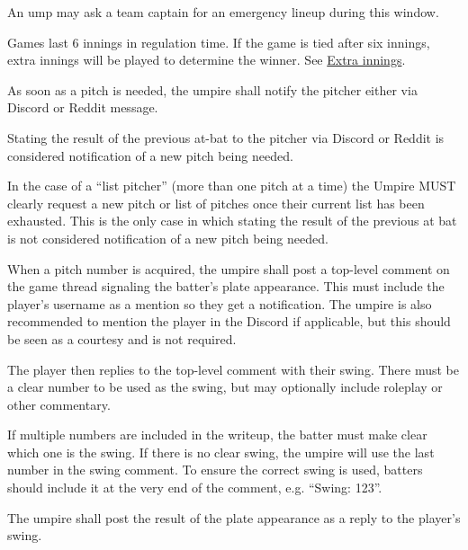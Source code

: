 \begin{deepEnumerate}
\begin{deepEnumerate}
\begin{deepEnumerate}
\begin{deepEnumerate}
\begin{deepEnumerate}
\begin{deepEnumerate}
						\item An ump may ask a team captain for an emergency lineup during this window.
					\end{deepEnumerate}
				\end{deepEnumerate}
			\end{deepEnumerate}
		\end{deepEnumerate}
		\item Games last 6 innings in regulation time. 
		If the game is tied after six innings, extra innings will be played to determine the winner. 
		See \hyperref[sec:extra innings]{Extra innings}.
		\item As soon as a pitch is needed, the umpire shall notify the pitcher either via Discord or Reddit message.
		\begin{deepEnumerate}
			\item Stating the result of the previous at-bat to the pitcher via Discord or Reddit is considered notification of a new 
			pitch being needed.
			\item  In the case of a “list pitcher” (more than one pitch at a time) the Umpire MUST clearly request a new pitch or list
			 of pitches once their current list has been exhausted. This is the only case in which stating the result of the previous
			 at bat is not considered notification of a new pitch being needed.
		\end{deepEnumerate}
		\item When a pitch number is acquired, 
		the umpire shall post a top-level comment on the game thread signaling the batter’s plate appearance. 
		This must include the player’s username as a mention so they get a notification. 
		The umpire is also recommended to mention the player in the Discord if applicable, 
		but this should be seen as a courtesy and is not required.
		\item The player then replies to the top-level comment with their swing. 
		There must be a clear number to be used as the swing, but may optionally include roleplay or other commentary.
		\begin{deepEnumerate}
			\item If multiple numbers are included in the writeup, the batter must make clear which one is the swing. 
			If there is no clear swing, the umpire will use the last number in the swing comment. 
			To ensure the correct swing is used, batters should include it at the very end of the comment, 
			e.g. “Swing: 123”.
		\end{deepEnumerate}
		\item The umpire shall post the result of the plate appearance as a reply to the player’s swing.

\end{deepEnumerate}
\end{deepEnumerate}
